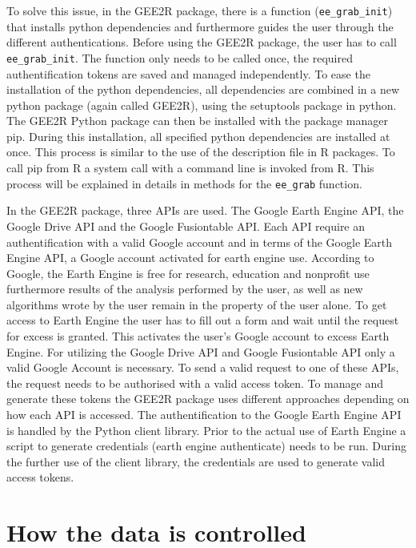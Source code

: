 \documentclass[11pt,twoside,a4paper,final]{report}
\begin{document}
To solve this issue, in the GEE2R package, there is a function (\texttt{ee\_grab\_init}) that installs python dependencies and furthermore guides the user through the different authentications. Before using the GEE2R package, the user has to call \texttt{ee\_grab\_init}. The function only needs to be called once, the required authentification tokens are saved and managed independently. 
To ease the installation of the python dependencies, all dependencies are combined in a new python package (again called GEE2R), using the setuptools package in python. The GEE2R Python package can then be installed with the package manager pip. During this installation, all specified python dependencies are installed at once. This process is similar to the use of the description file in R packages. To call pip from R a system call with a command line is invoked from R. This process will be explained in details in methods for the \texttt{ee\_grab} function. 

In the GEE2R package, three APIs are used. The Google Earth Engine API, the Google Drive API and the Google Fusiontable API. Each API require an authentification with a valid Google account and in terms of the Google Earth Engine API, a Google account activated for earth engine use. According to Google, the Earth Engine is free for research, education and nonprofit use furthermore results of the analysis performed by the user, as well as new algorithms wrote by the user remain in the property of the user alone.
To get access to Earth Engine the user has to fill out a form and wait until the request for excess is granted. This activates the user's Google account to excess Earth Engine. For utilizing the Google Drive API and Google Fusiontable API only a valid Google Account is necessary. To send a valid request to one of these APIs, the request needs to be authorised with a valid access token. To manage and generate these tokens the GEE2R package uses different approaches depending on how each API is accessed. The authentification to the Google Earth Engine API is handled by the Python client library. Prior to the actual use of Earth Engine a script to generate credentials (earth engine authenticate) needs to be run. During the further use of the client library, the credentials are used to generate valid access tokens.



\section{How the data is controlled}
\end{document}
